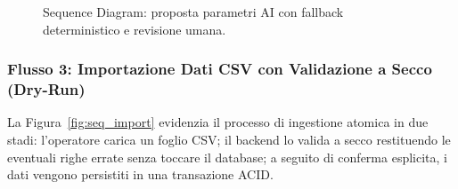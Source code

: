\begin{figure}[H]
    \caption{Sequence Diagram: proposta parametri AI con fallback deterministico e revisione umana.}
    \label{fig:seq_ai}
\end{figure}

\subsubsection{Flusso 3: Importazione Dati CSV con Validazione a Secco (Dry-Run)}
La Figura~\ref{fig:seq_import} evidenzia il processo di ingestione atomica in due stadi: l'operatore carica un foglio CSV; il backend lo valida a secco restituendo le eventuali righe errate senza toccare il database; a seguito di conferma esplicita, i dati vengono persistiti in una transazione ACID.

